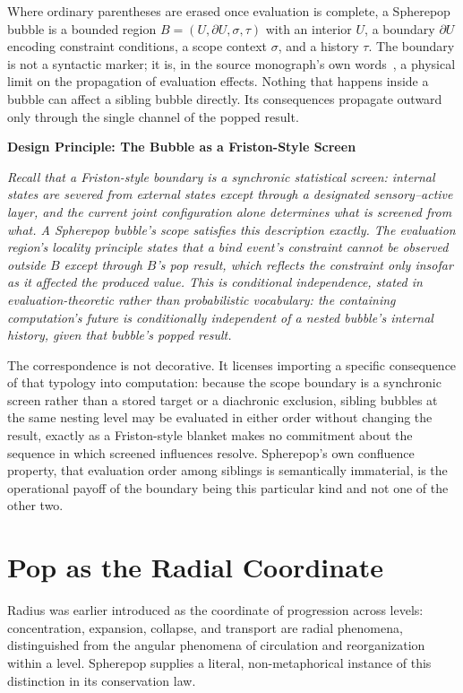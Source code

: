 \documentclass[11pt,fleqn]{book}
\numberwithin{equation}{chapter}
\newenvironment{principle}[1]
  {\begin{principleEnv}
   \noindent\textbf{Design Principle: #1}\par\smallskip\itshape}
  {\end{principleEnv}}
\theoremstyle{plain}
\theoremstyle{definition}
\theoremstyle{remark}
\begin{document}
Where ordinary parentheses are erased once evaluation is complete, a Spherepop bubble is a bounded region \(B=(U,\partial U,\sigma,\tau)\) with an interior \(U\), a boundary \(\partial U\) encoding constraint conditions, a scope context \(\sigma\), and a history \(\tau\). The boundary is not a syntactic marker; it is, in the source monograph's own words~\cite{spherepop-geometry}, a physical limit on the propagation of evaluation effects. Nothing that happens inside a bubble can affect a sibling bubble directly. Its consequences propagate outward only through the single channel of the popped result.

\begin{principle}{The Bubble as a Friston-Style Screen}
Recall that a Friston-style boundary is a synchronic statistical screen: internal states are severed from external states except through a designated sensory--active layer, and the current joint configuration alone determines what is screened from what. A Spherepop bubble's scope satisfies this description exactly. The evaluation region's locality principle states that a bind event's constraint cannot be observed outside \(B\) except through \(B\)'s pop result, which reflects the constraint only insofar as it affected the produced value. This is conditional independence, stated in evaluation-theoretic rather than probabilistic vocabulary: the containing computation's future is conditionally independent of a nested bubble's internal history, given that bubble's popped result.
\end{principle}

The correspondence is not decorative. It licenses importing a specific consequence of that typology into computation: because the scope boundary is a synchronic screen rather than a stored target or a diachronic exclusion, sibling bubbles at the same nesting level may be evaluated in either order without changing the result, exactly as a Friston-style blanket makes no commitment about the sequence in which screened influences resolve. Spherepop's own confluence property, that evaluation order among siblings is semantically immaterial, is the operational payoff of the boundary being this particular kind and not one of the other two.

\section{Pop as the Radial Coordinate}

Radius was earlier introduced as the coordinate of progression across levels: concentration, expansion, collapse, and transport are radial phenomena, distinguished from the angular phenomena of circulation and reorganization within a level. Spherepop supplies a literal, non-metaphorical instance of this distinction in its conservation law.
\end{document}
